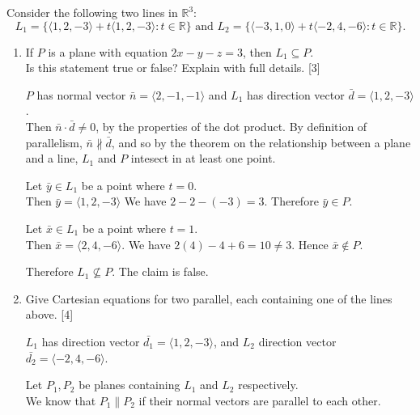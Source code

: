 \documentclass[11pt]{article}
\begin{document}
Consider the following two lines in \(\mathbb{R}^3\):
    \[
        L_1 = \{\langle1,2,-3\rangle + t\langle1,2,-3\rangle : t \in \mathbb{R}\}
        \text{ and }
        L_2 = \{\langle-3,1,0\rangle + t\langle-2,4,-6\rangle : t \in \mathbb{R}\}.
    \]
\begin{enumerate}[label=\alph*), series=Last]
    \item If \(P\) is a plane with equation \(2x-y-z=3\), then \(L_1 \subseteq P\).\\
    Is this statement true or false? Explain with full details. \hfill [3]

    \color{blue}
    \(P\) has normal vector \(\bar{n} = \langle 2,-1,-1\rangle\) and \(L_1\) has direction vector \(\bar{d} = \langle 1,2,-3\rangle\).\\
    Then \(\bar{n} \cdot \bar{d} \neq 0\), by the properties of the dot product. By definition of parallelism, \(\bar{n} \nparallel  \bar{d}\), and
    so by the theorem on the relationship between a plane and a line, \(L_1\) and \(P\) intesect in at least one point.

    Let \(\bar{y} \in L_1\) be a point where \(t= 0\).\\
    Then \(\bar{y} = \langle1,2,-3\rangle\)
    We have \(2 -  2- (-3) = 3\). Therefore \(\bar{y} \in P\).

    \vspace{0.5em}
    Let \(\bar{x} \in L_1\) be a point where \(t = 1\).\\
    Then \(\bar{x} = \langle2,4,-6\rangle.\)
    We have \( 2(4) -4 + 6 = 10 \neq 3\). Hence \(\bar{x} \notin P\). 
    
    \vspace{0.5em}
    Therefore \(L_1 \nsubseteq P\). The claim is false.

    \color{black}

    \item Give Cartesian equations for two parallel, each containing one of the lines above. \hfill [4]
    \color{blue}

    \(L_1\) has direction vector \(\bar{d_1} = \langle1,2,-3\rangle\), and \(L_2\) direction vector \(\bar{d_2} = \langle-2,4,-6\rangle\).

    Let \(P_1,P_2\) be planes containing \(L_1\) and \(L_2\) respectively.\\
    We know that \(P_1\parallel P_2\) if their normal vectors are parallel to each other.

    \vspace{1em}


\end{enumerate}
\end{document}
